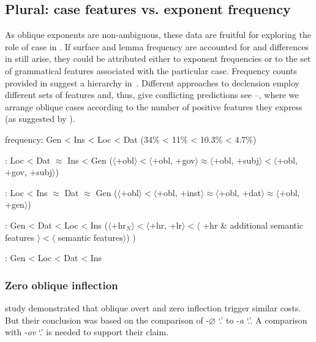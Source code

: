 \documentclass[output=paper, modfonts,newtxmath,hidelinks]{langscibook}
\begin{document}
\subsection{Plural: case features vs. exponent frequency}
As oblique  exponents are non-ambiguous, these data are fruitful for exploring the role of case in  . If surface and lemma frequency are accounted for and differences in   still arise, they could be attributed either to exponent frequencies or to the set of grammatical features associated with the particular case. Frequency counts provided in \citet{samojlova2014frequencies} suggest a hierarchy in~. Different approaches to  declension employ different sets of features and, thus, give conflicting predictions see --, where we arrange oblique cases according to the number of positive features they express (as suggested by \citealt{clahsen2001mental}).

\ea \ea \label{ex:freqpl} frequency: Gen < Ins < Loc < Dat (34\% < 11\% < 10.3\% < 4.7\%)
    
    \ex \label{ex:mueller}  \citealt{muller2004decomposing}: Loc < Dat $\approx$ Ins < Gen ($\langle$+obl$\rangle < \langle$+obl, +gov$\rangle \approx \langle$+obl, +subj$\rangle < \langle$+obl, +gov, +subj$\rangle$)
    
    \ex \label{ex:wiese}	\citealt{wiese2004categories}:  Loc < Ins $\approx$ Dat $\approx$ Gen ($\langle$+obl$\rangle < \langle$+obl, +inst$\rangle \approx \langle$+obl, +dat$\rangle \approx \langle$+obl, +gen$\rangle$)
    
    \ex \label{ex:wunderlich}	\citealt{wunderlich1996minimalist}: Gen < Dat < Loc < Ins ($\langle$+hr$_N \rangle < \langle$+hr, +lr$\rangle < \langle$ +hr \& additional semantic features $\rangle < \langle$ semantic features$\rangle$) 
)
    
    \ex \label{ex:caha} \citealt{caha2008case}: Gen < Loc < Dat < Ins
    \z
\z

\subsubsection{{Zero oblique inflection}} 
 study demonstrated that oblique overt and zero inflection trigger similar  costs. But their conclusion was based on the comparison of  -$\varnothing$ `\genn.\pl' to  -\textit{a} `\genn.\sg'. A comparison with  -\textit{ov} `\genn.\pl' is needed to support their claim.
\end{document}
